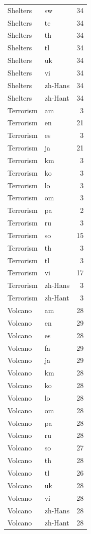 \begin{longtable}{p{3cm} p{3cm} r}
Shelters & sw & 34 \\
Shelters & te & 34 \\
Shelters & th & 34 \\
Shelters & tl & 34 \\
Shelters & uk & 34 \\
Shelters & vi & 34 \\
Shelters & zh-Hans & 34 \\
Shelters & zh-Hant & 34 \\
Terrorism & am & 3 \\
Terrorism & en & 21 \\
Terrorism & es & 3 \\
Terrorism & ja & 21 \\
Terrorism & km & 3 \\
Terrorism & ko & 3 \\
Terrorism & lo & 3 \\
Terrorism & om & 3 \\
Terrorism & pa & 2 \\
Terrorism & ru & 3 \\
Terrorism & so & 15 \\
Terrorism & th & 3 \\
Terrorism & tl & 3 \\
Terrorism & vi & 17 \\
Terrorism & zh-Hans & 3 \\
Terrorism & zh-Hant & 3 \\
Volcano & am & 28 \\
Volcano & en & 29 \\
Volcano & es & 28 \\
Volcano & fa & 29 \\
Volcano & ja & 29 \\
Volcano & km & 28 \\
Volcano & ko & 28 \\
Volcano & lo & 28 \\
Volcano & om & 28 \\
Volcano & pa & 28 \\
Volcano & ru & 28 \\
Volcano & so & 27 \\
Volcano & th & 28 \\
Volcano & tl & 26 \\
Volcano & uk & 28 \\
Volcano & vi & 28 \\
Volcano & zh-Hans & 28 \\
Volcano & zh-Hant & 28 \\

\end{longtable}
